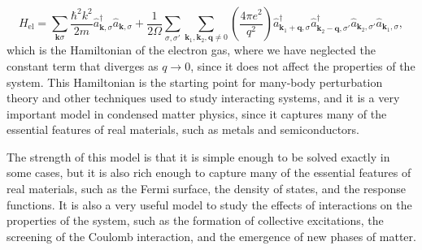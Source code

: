 \[
    H_{\text{el}} = \sum_{\mathbf{k} \sigma} \frac{\hbar^2 k^2}{2m} \hat{a}_{\mathbf{k}, \sigma}^\dagger \hat{a}_{\mathbf{k}, \sigma} + \frac{1}{2\Omega} \sum_{\sigma, \sigma'} \sum_{\mathbf{k}_1, \mathbf{k}_2, \mathbf{q}\neq 0} \left( \frac{4 \pi e^2}{q^2} \right) \hat{a}_{\mathbf{k}_1 + \mathbf{q}, \sigma}^\dagger \hat{a}_{\mathbf{k}_2 - \mathbf{q}, \sigma'}^\dagger \hat{a}_{\mathbf{k}_2, \sigma'} \hat{a}_{\mathbf{k}_1, \sigma},
\]
which is the Hamiltonian of the electron gas, where we have neglected the constant term that diverges as \(q \to 0\), since it does not affect the properties of the system. This Hamiltonian is the starting point for many-body perturbation theory and other techniques used to study interacting systems, and it is a very important model in condensed matter physics, since it captures many of the essential features of real materials, such as metals and semiconductors.

The strength of this model is that it is simple enough to be solved exactly in some cases, but it is also rich enough to capture many of the essential features of real materials, such as the Fermi surface, the density of states, and the response functions. It is also a very useful model to study the effects of interactions on the properties of the system, such as the formation of collective excitations, the screening of the Coulomb interaction, and the emergence of new phases of matter.

